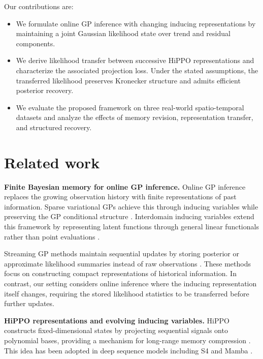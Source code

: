 \documentclass[twoside]{article}
\begin{document}
Our contributions are:
\begin{itemize}

\item We formulate online GP inference with changing inducing
representations by maintaining a joint Gaussian likelihood state over
trend and residual components.

\item We derive likelihood transfer between successive HiPPO
representations and characterize the associated projection loss. Under
the stated assumptions, the transferred likelihood preserves
Kronecker structure and admits efficient posterior recovery.

\item We evaluate the proposed framework on three real-world
spatio-temporal datasets and analyze the effects of memory revision,
representation transfer, and structured recovery.

\end{itemize}

\section{Related work}

\textbf{Finite Bayesian memory for online GP inference.}
Online GP inference replaces the growing observation history with finite
representations of past information. Sparse variational GPs achieve this
through inducing variables while preserving the GP conditional structure
\citep{Titsias2009,Matthews2016}. Interdomain inducing variables extend
this framework by representing latent functions through general linear
functionals rather than point evaluations
\citep{LazaroGredilla2009,VanderWilk2020}.

Streaming GP methods maintain sequential updates by storing posterior or
approximate likelihood summaries instead of raw observations
\citep{Csato2002,Bui2017,Maddox2021}. These methods focus on constructing
compact representations of historical information. In contrast, our
setting considers online inference where the inducing representation
itself changes, requiring the stored likelihood statistics to be
transferred before further updates.


\textbf{HiPPO representations and evolving inducing variables.}
HiPPO constructs fixed-dimensional states by projecting sequential
signals onto polynomial bases, providing a mechanism for long-range
memory compression \citep{Gu2020}. This idea has been adopted in deep
sequence models including S4 and Mamba
\citep{Gu2022S4,GuDao2023Mamba}. 
\end{document}
